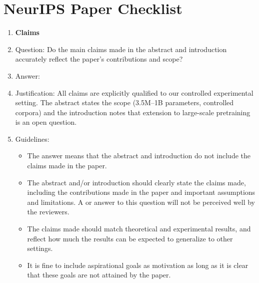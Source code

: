 \documentclass{article}
\begin{document}
\section*{NeurIPS Paper Checklist}

\begin{enumerate}

\item {\bf Claims}
    \item[] Question: Do the main claims made in the abstract and introduction accurately reflect the paper's contributions and scope?
    \item[] Answer: \answerYes{}
    \item[] Justification: All claims are explicitly qualified to our controlled experimental setting. The abstract states the scope (3.5M--1B parameters, controlled corpora) and the introduction notes that extension to large-scale pretraining is an open question.
    \item[] Guidelines:
    \begin{itemize}
        \item The answer \answerNA{} means that the abstract and introduction do not include the claims made in the paper.
        \item The abstract and/or introduction should clearly state the claims made, including the contributions made in the paper and important assumptions and limitations. A \answerNo{} or \answerNA{} answer to this question will not be perceived well by the reviewers.
        \item The claims made should match theoretical and experimental results, and reflect how much the results can be expected to generalize to other settings.
        \item It is fine to include aspirational goals as motivation as long as it is clear that these goals are not attained by the paper.
    \end{itemize}


\end{enumerate}
\end{document}
